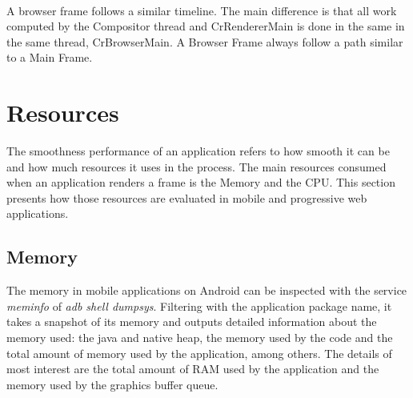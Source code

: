 \documentclass{kththesis}
\begin{document}
\paragraph{}
A browser frame follows a similar timeline. The main difference is that all work computed by the Compositor thread and CrRendererMain is done in the same in the same thread, CrBrowserMain. A Browser Frame always follow a path similar to a Main Frame.

\fi



\color{black}

\section{Resources}

The smoothness performance of an application refers to how smooth it can be and how much resources it uses in the process. The main resources consumed when an application renders a frame is the Memory and the CPU. This section presents how those resources are evaluated in mobile and progressive web applications.     

\subsection{Memory}
The memory in mobile applications on Android can be inspected with the service \textit{meminfo} of \textit{adb shell dumpsys}. Filtering with the application package name, it takes a snapshot of its memory and outputs detailed information about the memory used: the java and native heap, the memory used by the code and the total amount of memory used by the application, among others. The details of most interest are the total amount of RAM used by the application and the memory used by the graphics buffer queue.
\end{document}
